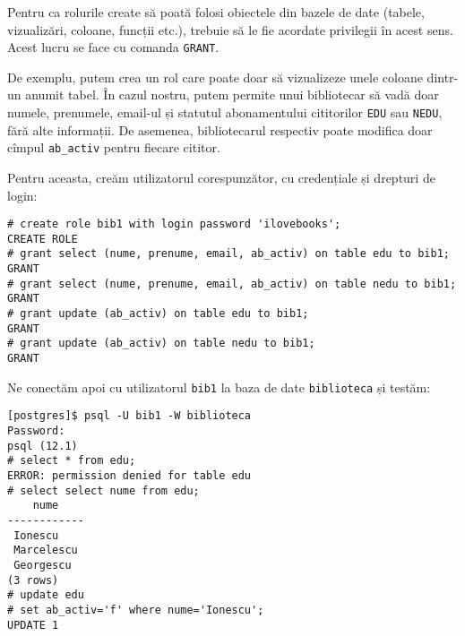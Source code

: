 Pentru ca rolurile create să poată folosi obiectele din bazele de date
(tabele, vizualizări, coloane, funcții etc.), trebuie să le fie acordate
privilegii în acest sens. Acest lucru se face cu comanda \texttt{GRANT}.

De exemplu, putem crea un rol care poate doar să vizualizeze unele
coloane dintr-un anumit tabel. În cazul nostru, putem permite unui
bibliotecar să vadă doar numele, prenumele, email-ul și statutul abonamentului
cititorilor \texttt{EDU} sau \texttt{NEDU}, fără alte informații. De asemenea,
bibliotecarul respectiv poate modifica doar cîmpul \texttt{ab\_activ} pentru
fiecare cititor.

Pentru aceasta, creăm utilizatorul corespunzător, cu credențiale și
drepturi de login:
{
  \small
\begin{verbatim}
# create role bib1 with login password 'ilovebooks';
CREATE ROLE
# grant select (nume, prenume, email, ab_activ) on table edu to bib1;
GRANT
# grant select (nume, prenume, email, ab_activ) on table nedu to bib1;
GRANT
# grant update (ab_activ) on table edu to bib1;
GRANT
# grant update (ab_activ) on table nedu to bib1;
GRANT
\end{verbatim}
}

Ne conectăm apoi cu utilizatorul \texttt{bib1} la baza de date \texttt{biblioteca}
și testăm:
{
  \small
\begin{verbatim}
[postgres]$ psql -U bib1 -W biblioteca
Password:
psql (12.1)
# select * from edu;
ERROR: permission denied for table edu
# select select nume from edu;
    nume    
------------
 Ionescu
 Marcelescu
 Georgescu
(3 rows)
# update edu
# set ab_activ='f' where nume='Ionescu';
UPDATE 1
\end{verbatim}
}

